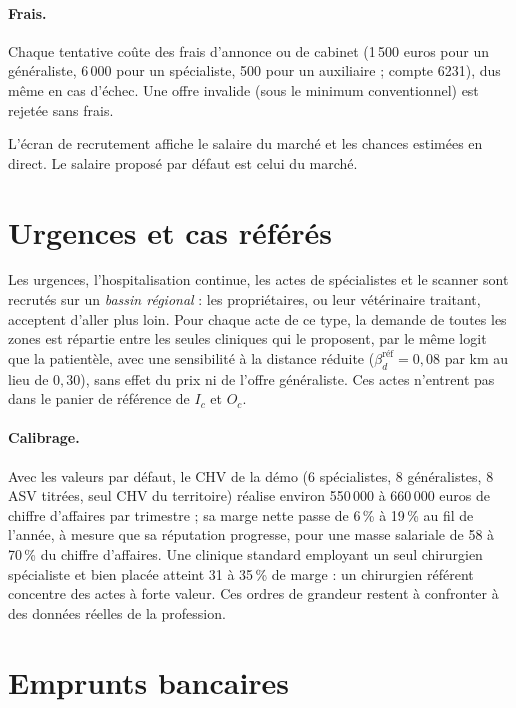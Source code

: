 \documentclass[11pt,a4paper]{article}
\begin{document}
\paragraph{Frais.} Chaque tentative coûte des frais d'annonce ou de
cabinet (1\,500 euros pour un généraliste, 6\,000 pour un spécialiste,
500 pour un auxiliaire ; compte 6231), dus même en cas d'échec. Une offre
invalide (sous le minimum conventionnel) est rejetée sans frais.

L'écran de recrutement affiche le salaire du marché et les chances
estimées en direct. Le salaire proposé par défaut est celui du marché.

\section{Urgences et cas référés}

Les urgences, l'hospitalisation continue, les actes de spécialistes et le
scanner sont recrutés sur un \emph{bassin régional} : les propriétaires,
ou leur vétérinaire traitant, acceptent d'aller plus loin. Pour chaque acte
de ce type, la demande de toutes les zones est répartie entre les seules
cliniques qui le proposent, par le même logit que la patientèle, avec une
sensibilité à la distance réduite ($\beta^{\text{réf}}_d = 0{,}08$ par km
au lieu de $0{,}30$), sans effet du prix ni de l'offre généraliste. Ces
actes n'entrent pas dans le panier de référence de $I_c$ et $O_c$.

\paragraph{Calibrage.} Avec les valeurs par défaut, le CHV de la démo
(6 spécialistes, 8 généralistes, 8 ASV titrées, seul CHV du territoire)
réalise environ 550\,000 à 660\,000 euros de chiffre d'affaires par
trimestre ; sa marge nette passe de 6\,\% à 19\,\% au fil de l'année, à
mesure que sa réputation progresse, pour une masse salariale de 58 à
70\,\% du chiffre d'affaires. Une clinique standard employant un seul
chirurgien spécialiste et bien placée atteint 31 à 35\,\% de marge : un
chirurgien référent concentre des actes à forte valeur. Ces ordres de
grandeur restent à confronter à des données réelles de la profession.

\section{Emprunts bancaires}
\end{document}
